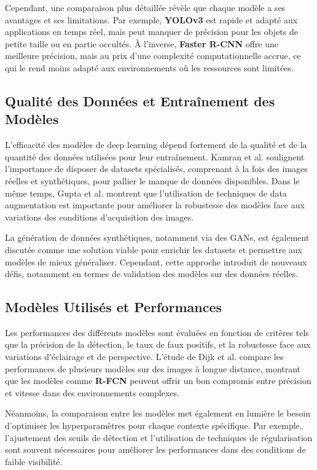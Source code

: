 Cependant, une comparaison plus détaillée révèle que chaque modèle a ses avantages et ses limitations. Par exemple, \textbf{YOLOv3} est rapide et adapté aux applications en temps réel, mais peut manquer de précision pour les objets de petite taille ou en partie occultés. À l'inverse, \textbf{Faster R-CNN} offre une meilleure précision, mais au prix d'une complexité computationnelle accrue, ce qui le rend moins adapté aux environnements où les ressources sont limitées.

\subsection{Qualité des Données et Entraînement des Modèles}

L'efficacité des modèles de deep learning dépend fortement de la qualité et de la quantité des données utilisées pour leur entraînement. Kamran et al. \cite{kamran2020} soulignent l'importance de disposer de datasets spécialisés, comprenant à la fois des images réelles et synthétiques, pour pallier le manque de données disponibles. Dans le même temps, Gupta et al. \cite{gupta2021} montrent que l'utilisation de techniques de data augmentation est importante pour améliorer la robustesse des modèles face aux variations des conditions d'acquisition des images.

La génération de données synthétiques, notamment via des GANs, est également discutée comme une solution viable pour enrichir les datasets et permettre aux modèles de mieux généraliser. Cependant, cette approche introduit de nouveaux défis, notamment en termes de validation des modèles sur des données réelles.

\subsection{Modèles Utilisés et Performances}

Les performances des différents modèles sont évaluées en fonction de critères tels que la précision de la détection, le taux de faux positifs, et la robustesse face aux variations d'éclairage et de perspective. L'étude de Dijk et al. \cite{spie2020} compare les performances de plusieurs modèles sur des images à longue distance, montrant que les modèles comme \textbf{R-FCN} peuvent offrir un bon compromis entre précision et vitesse dans des environnements complexes.

Néanmoins, la comparaison entre les modèles met également en lumière le besoin d'optimiser les hyperparamètres pour chaque contexte spécifique. Par exemple, l'ajustement des seuils de détection et l'utilisation de techniques de régularisation sont souvent nécessaires pour améliorer les performances dans des conditions de faible visibilité.

